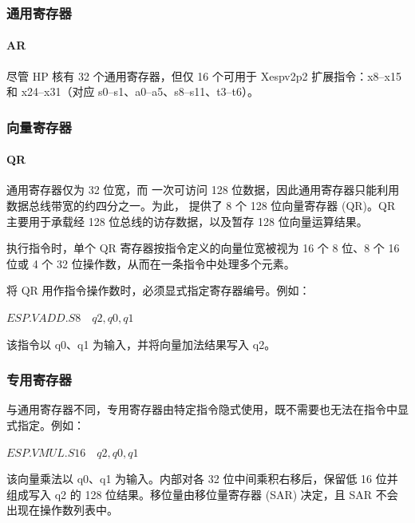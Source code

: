 \documentclass[main\_\_CN.tex]{subfiles}
\begin{document}
\subsubsection{通用寄存器}
\paragraph{AR}


尽管 HP 核有 32 个通用寄存器，但仅 16 个可用于 Xespv2p2 扩展指令：x8–x15 和 x24–x31（对应 s0–s1、a0–a5、s8–s11、t3–t6）。



\subsubsection{向量寄存器}

\paragraph{QR}

通用寄存器仅为 32 位宽，而 \chipname{} 一次可访问 128 位数据，因此通用寄存器只能利用数据总线带宽的约四分之一。为此，\chipname{} 提供了 8 个 128 位向量寄存器 (QR)。QR 主要用于承载经 128 位总线的访存数据，以及暂存 128 位向量运算结果。

执行指令时，单个 QR 寄存器按指令定义的向量位宽被视为 16 个 8 位、8 个 16 位或 4 个 32 位操作数，从而在一条指令中处理多个元素。

将 QR 用作指令操作数时，必须显式指定寄存器编号。例如：

\begin{center}
    $\hyperref[instruction:ESPVADDS8]{ESP.VADD.S8} \hspace{1em} q2, q0, q1$
    \end{center}

该指令以 q0、q1 为输入，并将向量加法结果写入 q2。

\subsubsection{专用寄存器}
\label{sec:pie-spec-reg}

与通用寄存器不同，专用寄存器由特定指令隐式使用，既不需要也无法在指令中显式指定。例如：

\begin{center}
    $\hyperref[instruction:ESPVMULS16]{ESP.VMUL.S16} \hspace{1em} q2, q0, q1$
\end{center}

该向量乘法以 q0、q1 为输入。内部对各 32 位中间乘积右移后，保留低 16 位并组成写入 q2 的 128 位结果。移位量由移位量寄存器 (SAR) 决定，且 SAR 不会出现在操作数列表中。
\end{document}
